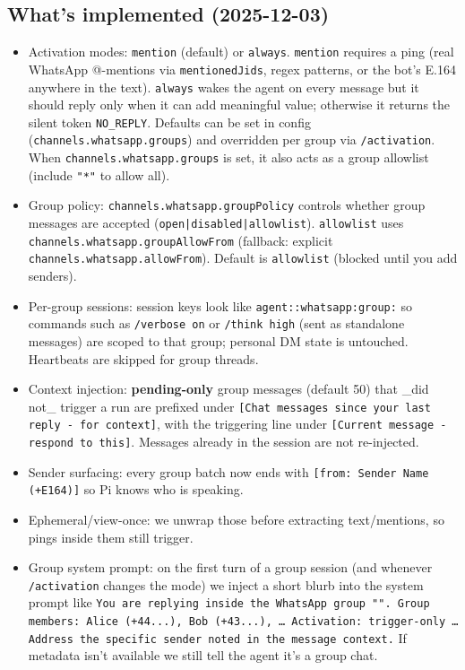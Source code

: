 \subsection{What’s implemented (2025-12-03)}


\begin{itemize}
  \item Activation modes: \texttt{mention} (default) or \texttt{always}. \texttt{mention} requires a ping (real WhatsApp @-mentions via \texttt{mentionedJids}, regex patterns, or the bot’s E.164 anywhere in the text). \texttt{always} wakes the agent on every message but it should reply only when it can add meaningful value; otherwise it returns the silent token \texttt{NO\_REPLY}. Defaults can be set in config (\texttt{channels.whatsapp.groups}) and overridden per group via \texttt{/activation}. When \texttt{channels.whatsapp.groups} is set, it also acts as a group allowlist (include \texttt{"*"} to allow all).
  \item Group policy: \texttt{channels.whatsapp.groupPolicy} controls whether group messages are accepted (\texttt{open|disabled|allowlist}). \texttt{allowlist} uses \texttt{channels.whatsapp.groupAllowFrom} (fallback: explicit \texttt{channels.whatsapp.allowFrom}). Default is \texttt{allowlist} (blocked until you add senders).
  \item Per-group sessions: session keys look like \texttt{agent::whatsapp:group:} so commands such as \texttt{/verbose on} or \texttt{/think high} (sent as standalone messages) are scoped to that group; personal DM state is untouched. Heartbeats are skipped for group threads.
  \item Context injection: \textbf{pending-only} group messages (default 50) that \_did not\_ trigger a run are prefixed under \texttt{[Chat messages since your last reply - for context]}, with the triggering line under \texttt{[Current message - respond to this]}. Messages already in the session are not re-injected.
  \item Sender surfacing: every group batch now ends with \texttt{[from: Sender Name (+E164)]} so Pi knows who is speaking.
  \item Ephemeral/view-once: we unwrap those before extracting text/mentions, so pings inside them still trigger.
  \item Group system prompt: on the first turn of a group session (and whenever \texttt{/activation} changes the mode) we inject a short blurb into the system prompt like \texttt{You are replying inside the WhatsApp group "". Group members: Alice (+44...), Bob (+43...), … Activation: trigger-only … Address the specific sender noted in the message context.} If metadata isn’t available we still tell the agent it’s a group chat.
\end{itemize}


